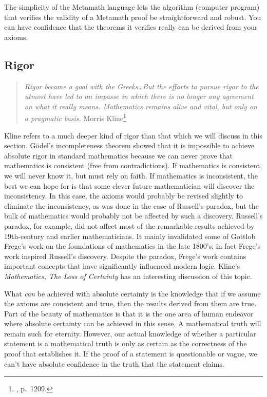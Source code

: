 The simplicity of the Metamath language lets the algorithm (computer program)
that verifies the validity of a Metamath proof be straightforward and
robust.  You can have confidence that the theorems it verifies really can be
derived from your axioms.

\subsection{Rigor}

\begin{quote}
  {\em Rigor became a goal with the Greeks\ldots But the efforts to
  pursue rigor to the utmost have led to an impasse in which there is
  no longer any agreement on what it really means.  Mathematics remains
  alive and vital, but only on a pragmatic basis.}
    \flushright\sc  Morris Kline\footnote{\cite{Kline}, p.~1209.}\\
\end{quote}

Kline refers to a much deeper kind of rigor than that which we will discuss in
this section.  G\"{o}del's incompleteness theorem showed that it is impossible to achieve absolute rigor
in standard mathematics because we can never prove that mathematics is
consistent (free from contradictions).  If
mathematics is consistent, we will never know it, but must rely on faith.  If
mathematics is inconsistent, the best we can hope for is that some clever
future mathematician will discover the inconsistency.  In this case, the
axioms would probably be revised slightly to eliminate the inconsistency, as
was done in the case of Russell's paradox, but the
bulk of mathematics would probably not be affected by such a discovery.
Russell's paradox, for example, did not affect most of the remarkable results
achieved by 19th-century and earlier mathematicians.  It mainly invalidated
some of Gottlob Frege's work on the foundations of
mathematics in the late 1800's; in fact Frege's work inspired Russell's
discovery.  Despite the paradox, Frege's work contains important concepts that
have significantly influenced modern logic.  Kline's {\em Mathematics, The
Loss of Certainty} \cite{Klinel} has an interesting
discussion of this topic.

What {\em can} be achieved with absolute certainty is the
knowledge that if we assume the axioms are consistent and true, then the
results derived from them are true.  Part of the beauty of mathematics is that
it is the one area of human endeavor where absolute certainty can be achieved
in this sense.  A mathematical truth will remain such for eternity.  However,
our actual knowledge of whether a particular statement is a mathematical truth
is only as certain as the correctness of the proof that establishes it.  If
the proof of a statement is questionable or vague, we can't have absolute
confidence in the truth that the statement claims.

